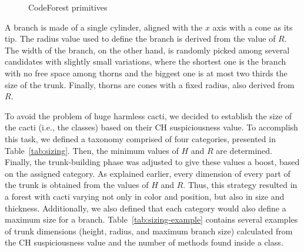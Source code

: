 \begin{figure}
    \centering
    \caption{CodeForest primitives}
\end{figure}

A branch is made of a single cylinder, aligned with the $x$ axis with a cone as
its tip. The radius value used to define the branch is derived from the value of
$R$. The width of the branch, on the other hand, is randomly picked among
several candidates with slightly small variations, where the shortest one is the
branch with no free space among thorns and the biggest one is at most two
thirds the size of the trunk. Finally, thorns are cones with a fixed radius,
also derived from $R$.

To avoid the problem of huge harmless cacti, we decided to establish the size of
the cacti (i.e., the classes) based on their CH suspiciousness value.
To accomplish this task, we defined a taxonomy comprised of four categories,
presented in Table~\ref{tab:sizing}.
Then, the minimum values of $H$ and $R$ are determined. Finally, the
trunk-building phase was adjusted to give these values a boost, based on the
assigned category. As explained earlier, every dimension of every part of the
trunk is obtained from the values of $H$ and $R$. Thus, this strategy resulted
in a forest with cacti varying not only in color and position, but also in size
and thickness. Additionally, we also defined that each category would also
define a maximum size for a branch. Table~\ref{tab:sizing-example} contains
several examples of trunk dimensions (height, radius, and maximum branch size)
calculated from the CH suspiciousness value and the number of methods found
inside a class. 

